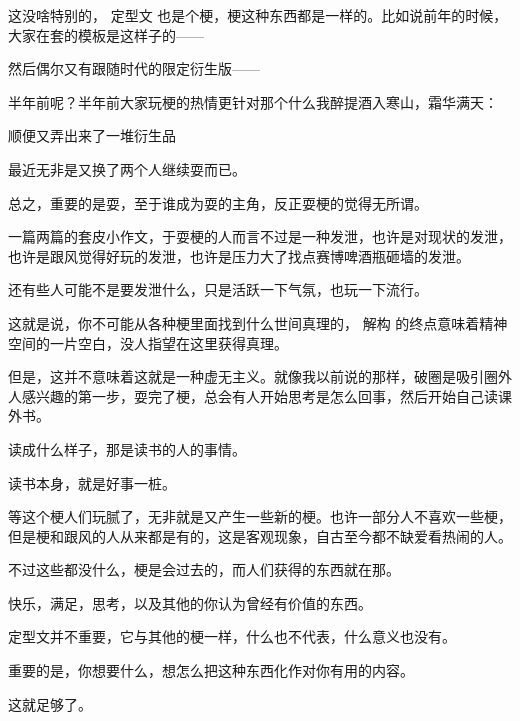 \begin{zhihuanswer}
这没啥特别的， 定型文
也是个梗，梗这种东西都是一样的。比如说前年的时候，大家在套的模板是这样子的------

然后偶尔又有跟随时代的限定衍生版------

半年前呢？半年前大家玩梗的热情更针对那个什么我醉提酒入寒山，霜华满天：

顺便又弄出来了一堆衍生品

最近无非是又换了两个人继续耍而已。

总之，重要的是耍，至于谁成为耍的主角，反正耍梗的觉得无所谓。

一篇两篇的套皮小作文，于耍梗的人而言不过是一种发泄，也许是对现状的发泄，也许是跟风觉得好玩的发泄，也许是压力大了找点赛博啤酒瓶砸墙的发泄。

还有些人可能不是要发泄什么，只是活跃一下气氛，也玩一下流行。

这就是说，你不可能从各种梗里面找到什么世间真理的， 解构
的终点意味着精神空间的一片空白，没人指望在这里获得真理。

但是，这并不意味着这就是一种虚无主义。就像我以前说的那样，破圈是吸引圈外人感兴趣的第一步，耍完了梗，总会有人开始思考是怎么回事，然后开始自己读课外书。

读成什么样子，那是读书的人的事情。

读书本身，就是好事一桩。

等这个梗人们玩腻了，无非就是又产生一些新的梗。也许一部分人不喜欢一些梗，但是梗和跟风的人从来都是有的，这是客观现象，自古至今都不缺爱看热闹的人。

不过这些都没什么，梗是会过去的，而人们获得的东西就在那。

快乐，满足，思考，以及其他的你认为曾经有价值的东西。

定型文并不重要，它与其他的梗一样，什么也不代表，什么意义也没有。

重要的是，你想要什么，想怎么把这种东西化作对你有用的内容。

这就足够了。
\end{zhihuanswer}

